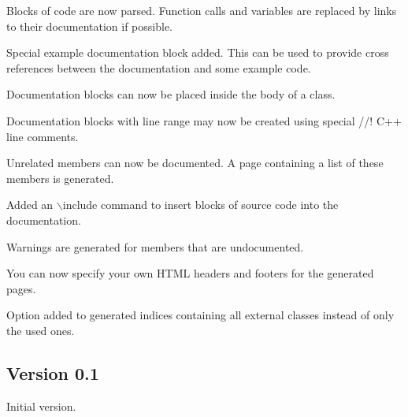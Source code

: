 \begin{DoxyItemize}
\item Blocks of code are now parsed. Function calls and variables are replaced by links to their documentation if possible. 
\item Special example documentation block added. This can be used to provide cross references between the documentation and some example code. 
\item Documentation blocks can now be placed inside the body of a class. 
\item Documentation blocks with line range may now be created using special {\ttfamily //!} C++ line comments. 
\item Unrelated members can now be documented. A page containing a list of these members is generated. 
\item Added an {\ttfamily $\backslash$include} command to insert blocks of source code into the documentation. 
\item Warnings are generated for members that are undocumented. 
\item You can now specify your own HTML headers and footers for the generated pages. 
\item Option added to generated indices containing all external classes instead of only the used ones. 
\end{DoxyItemize}

\subsection*{Version 0.1}

Initial version. 